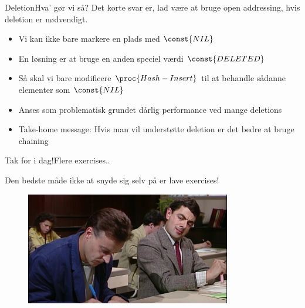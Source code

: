 \documentclass[aspectratio=1610]{beamer}
\begin{document}
\begin{frame}{Deletion}{Hva' gør vi så?}
    Det korte svar er, lad være at bruge open addressing, hvis deletion er
    nødvendigt.

    \begin{itemize}
        \item Vi kan ikke bare markere en plads med $\const{NIL}$
        \item En løsning er at bruge en anden speciel værdi $\const{DELETED}$
        \item Så skal vi bare modificere $\proc{Hash-Insert}$ til at behandle
            sådanne elementer som $\const{NIL}$
        \item Anses som problematisk grundet dårlig performance ved mange
            deletions
        \item \alert{Take-home message:} Hvis man vil understøtte deletion er
            det bedre at bruge chaining
    \end{itemize}
\end{frame}

\begin{frame}{Tak for i dag!}{Flere exercises..}

    Den bedste måde ikke at snyde sig selv på er lave exercises!

    \begin{figure}[h]
        \centering
        \includegraphics[width=0.8\textwidth]{../exercises}
    \end{figure}
    
\end{frame}
\end{document}
